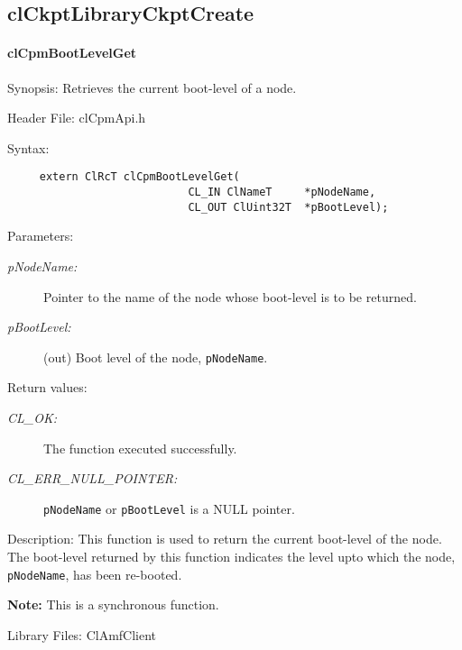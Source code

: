 {\subsection{clCkptLibraryCkptCreate}
\hypertarget{pagecpm105}{}\paragraph{cl\-Cpm\-Boot\-Level\-Get}\label{pagecpm105}
\begin{Desc}
\item[Synopsis:]Retrieves the current boot-level of a node.\end{Desc}
\begin{Desc}
\item[Header File:]clCpmApi.h\end{Desc}
\begin{Desc}
\item[Syntax:]

\footnotesize\begin{verbatim}     extern ClRcT clCpmBootLevelGet(
                			CL_IN ClNameT     *pNodeName,
                			CL_OUT ClUint32T  *pBootLevel);
\end{verbatim}
\normalsize
\end{Desc}
\begin{Desc}
\item[Parameters:]
\begin{description}
\item[{\em p\-Node\-Name:}]Pointer to the name of the node whose boot-level is to be returned. 
\item[{\em p\-Boot\-Level:}](out) Boot level of the node, {\tt{p\-Node\-Name}}.
\end{description}
\end{Desc}
\begin{Desc}
\item[Return values:]
\begin{description}
\item[{\em CL\_\-OK:}]The function executed successfully. \item[{\em CL\_\-ERR\_\-NULL\_\-POINTER:}]{\tt{pNodeName}} or {\tt{pBootLevel}} is a NULL 
pointer.\end{description}
\end{Desc}
\begin{Desc}
\item[Description:]This function is used to return the current boot-level of the node. The boot-level returned by this function indicates the level upto 
which the node, {\tt{p\-Node\-Name}}, has been re-booted.\end{Desc}
{\bf Note:} This is a synchronous function.
\begin{Desc}
\item[Library Files:]Cl\-Amf\-Client\end{Desc}

}
